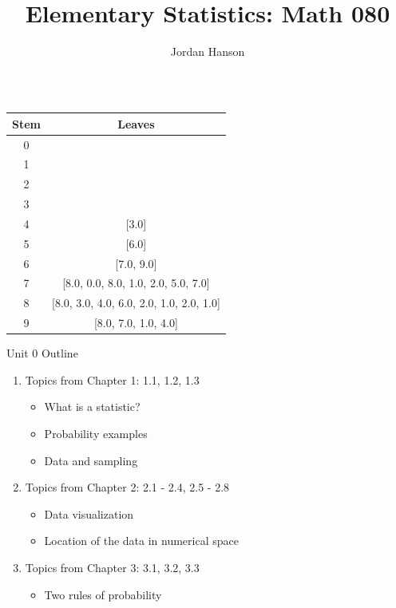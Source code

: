 \documentclass{beamer}
\title{Elementary Statistics: Math 080}
\author{Jordan Hanson}
\institute{Whittier College Department of Physics and Astronomy}
\begin{document}
\maketitle

\begin{frame}
\begin{table}
\begin{tabular}{| c | c |}
\hline
\hline
Stem & Leaves \\ \hline
0 &   \\ \hline
1 &   \\ \hline
2 &   \\ \hline
3 &   \\ \hline
4 & [3.0] \\ \hline
5 & [6.0] \\ \hline
6 & [7.0, 9.0] \\ \hline
7 & [8.0, 0.0, 8.0, 1.0, 2.0, 5.0, 7.0] \\ \hline
8 & [8.0, 3.0, 4.0, 6.0, 2.0, 1.0, 2.0, 1.0] \\ \hline
9 & [8.0, 7.0, 1.0, 4.0] \\ \hline
\hline
\end{tabular}
\caption{}
\end{table}
\end{frame}

\begin{frame}{Unit 0 Outline}
\begin{enumerate}
\item Topics from Chapter 1: 1.1, 1.2, 1.3
\begin{itemize}
\item What is a statistic?
\item Probability examples
\item Data and sampling
\end{itemize}
\item Topics from Chapter 2: 2.1 - 2.4, 2.5 - 2.8
\begin{itemize}
\item Data visualization
\item Location of the data in numerical space
\end{itemize}
\item Topics from Chapter 3: 3.1, 3.2, 3.3
\begin{itemize}
\item Two rules of probability
\end{itemize}
\end{enumerate}
\end{frame}
\end{document}
